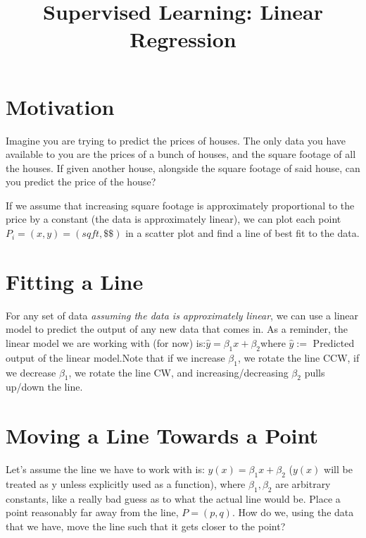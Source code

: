 \documentclass{article}
\title{Supervised Learning: Linear Regression}
\begin{document}
\maketitle
\section{Motivation}
Imagine you are trying to predict the prices of houses. The only data you have available to you are the prices of a bunch of houses, and the square footage of all the houses. If given another house, alongside the square footage of said house, can you predict the price of the house?

If we assume that increasing square footage is approximately proportional to the price by a constant (the data is approximately linear), we can plot each point $P_i = (x, y) = (sq ft, \$\$)$ in a scatter plot and find a line of best fit to the data.

\section{Fitting a Line}
For any set of data \emph{assuming the data is approximately linear}, we can use a linear model to predict the output of any new data that comes in. 
As a reminder, the linear model we are working with (for now) is:\newline $\hat{y} = \beta_1x + \beta_2$\newline where \newline $\hat{y} :=$ Predicted output of the linear model.\newline Note that if we increase $\beta_1$, we rotate the line CCW, if we decrease $\beta_1$, we rotate the line CW, and increasing/decreasing $\beta_2$ pulls up/down the line.
\section{Moving a Line Towards a Point}
Let's assume the line we have to work with is: $y(x) = \beta_1x + \beta_2$ ($y(x)$ will be treated as y unless explicitly used as a function), where $\beta_1, \beta_2$ are arbitrary constants, like a really bad guess as to what the actual line would be. Place a point reasonably far away from the line, $P = (p, q)$. How do we, using the data that we have, move the line such that it gets closer to the point? 
\end{document}
